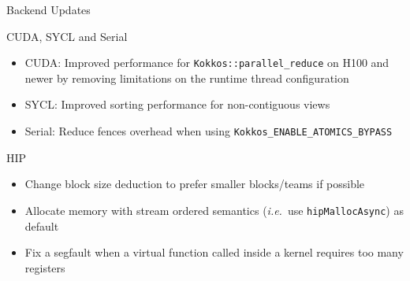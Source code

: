 
\begin{frame}[fragile]

  {\Huge Backend Updates}

  \vspace{10pt}

\end{frame}





\begin{frame}[fragile]{CUDA, SYCL and Serial}
  \begin{itemize}
      \item CUDA: Improved performance for \texttt{Kokkos::parallel\_reduce} on H100 and newer by removing limitations on the runtime thread configuration
      \item SYCL: Improved sorting performance for non-contiguous views
      \item Serial: Reduce fences overhead when using \texttt{Kokkos\_ENABLE\_ATOMICS\_BYPASS}
  \end{itemize}
\end{frame}

\begin{frame}[fragile]{HIP}
  \begin{itemize}
      \item Change block size deduction to prefer smaller blocks/teams if possible
      \item Allocate memory with stream ordered semantics (\emph{i.e.}\ use \texttt{hipMallocAsync}) as default
      \item Fix a segfault when a virtual function called inside a kernel requires too many registers
  \end{itemize}
\end{frame}




